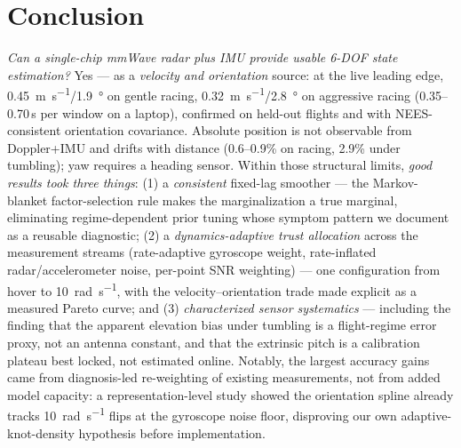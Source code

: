 \documentclass[conference]{IEEEtran}
\begin{document}
\section{Conclusion}
\label{sec:conclusion}

\emph{Can a single-chip mmWave radar plus IMU provide usable 6-DOF
state estimation?}  Yes --- as a \emph{velocity and orientation}
source: at the live leading edge,
\SI{0.45}{\metre\per\second}/\SI{1.9}{\degree} on gentle racing,
\SI{0.32}{\metre\per\second}/\SI{2.8}{\degree} on aggressive racing
(0.35--0.70\,s per window on a laptop), confirmed on held-out flights
and with NEES-consistent orientation covariance.
Absolute position is not observable from Doppler+IMU and drifts with
distance (0.6--0.9\% on racing, 2.9\% under tumbling); yaw requires a
heading sensor.  Within those structural limits, \emph{good results
took three things}: (1) a \emph{consistent} fixed-lag smoother ---
the Markov-blanket factor-selection rule makes the marginalization a
true marginal, eliminating regime-dependent prior tuning whose
symptom pattern we document as a reusable diagnostic;
(2) a \emph{dynamics-adaptive trust allocation} across the
measurement streams (rate-adaptive gyroscope weight, rate-inflated
radar/accelerometer noise, per-point SNR weighting) --- one
configuration from hover to \SI{10}{\radian\per\second}, with the
velocity--orientation trade made explicit as a measured Pareto curve;
and (3) \emph{characterized sensor systematics} --- including the
finding that the apparent elevation bias under tumbling is a
flight-regime error proxy, not an antenna constant, and that the
extrinsic pitch is a calibration plateau best locked, not estimated
online.  Notably, the largest accuracy gains came from diagnosis-led
re-weighting of existing measurements, not from added model capacity:
a representation-level study showed the orientation spline already
tracks \SI{10}{\radian\per\second} flips at the gyroscope noise floor,
disproving our own adaptive-knot-density hypothesis before
implementation.
\end{document}
